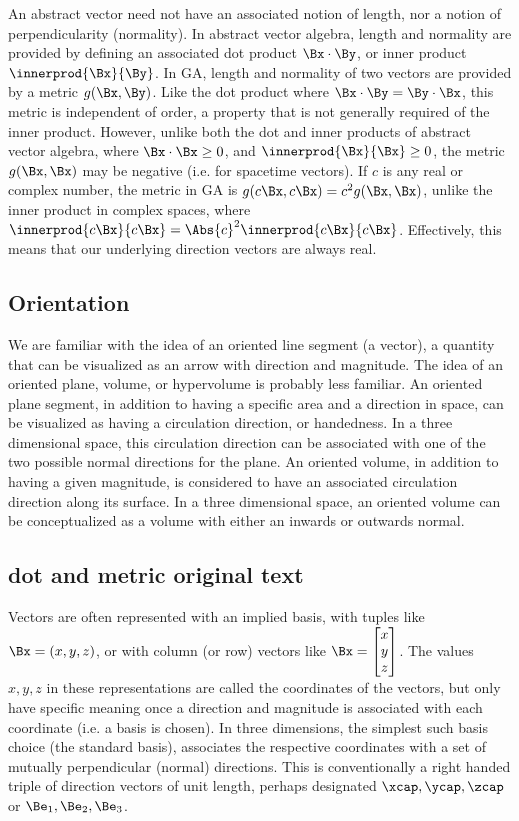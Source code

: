 An abstract vector need not have an associated notion of length, nor a notion of perpendicularity (normality).
In abstract vector algebra, length and normality are provided by defining an associated dot product \(\Bx \cdot \By\), or inner product \(\innerprod{\Bx}{\By}\).
In GA, length and normality of two vectors are provided by a metric \(g(\Bx, \By)\).
Like the dot product where \( \Bx \cdot \By = \By \cdot \Bx\), this metric is independent of order, a property that is not generally required of the inner product.
However, unlike both the dot and inner products of abstract vector algebra, where \( \Bx \cdot \Bx \ge 0\), and \( \innerprod{\Bx}{\Bx} \ge 0\), the metric \(g(\Bx, \Bx)\) may be negative (i.e. for spacetime vectors).
If \(c \) is any real or complex number, the metric in GA is \( g(c \Bx, c \Bx) = c^2 g(\Bx, \Bx)\), unlike the inner product in complex spaces, where \( \innerprod{c \Bx}{c \Bx} = \Abs{c}^2 \innerprod{c \Bx}{c \Bx} \).
Effectively, this means that our underlying direction vectors are always real.

\subsection{Orientation}
We are familiar with the idea of an oriented line segment (a vector), a quantity that can be visualized as an arrow with direction and magnitude.
The idea of an oriented plane, volume, or hypervolume is probably less familiar.
An oriented plane segment, in addition to having a specific area and a direction in space, can be visualized as having a
circulation direction, or handedness.
In a three dimensional space, this circulation direction can be associated with one of the two possible normal directions for the plane.
An oriented volume, in addition to having a given magnitude, is considered to have an associated circulation direction along its surface.
In a three dimensional space, an oriented volume can be conceptualized as a volume with either an inwards or outwards normal.

\subsection{dot and metric original text}

Vectors are often represented with an implied basis, with tuples like \( \Bx = (x,y,z) \), or with column (or row) vectors like
\(
   \Bx =
\begin{bmatrix}
x \\
y \\
z
\end{bmatrix}
\).
The values \( x, y, z \) in these representations are called the coordinates of the vectors, but only have specific meaning once a direction and magnitude is associated with each coordinate (i.e. a basis is chosen).
In three dimensions, the simplest such basis choice (the standard basis), associates the respective coordinates with a set of mutually perpendicular (normal) directions.
This is conventionally a right handed triple of direction vectors of unit length, perhaps designated \( \xcap, \ycap, \zcap \) or \( \Be_1, \Be_2, \Be_3 \).

